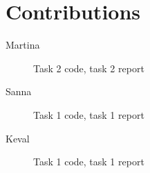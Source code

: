 \documentclass[a4paper]{article}
\begin{document}
\section{Contributions}
\begin{description}
    \item[Martina] Task 2 code, task 2 report
    \item[Sanna] Task 1 code, task 1 report
    \item[Keval] Task 1 code, task 1 report
\end{description}
\end{document}
